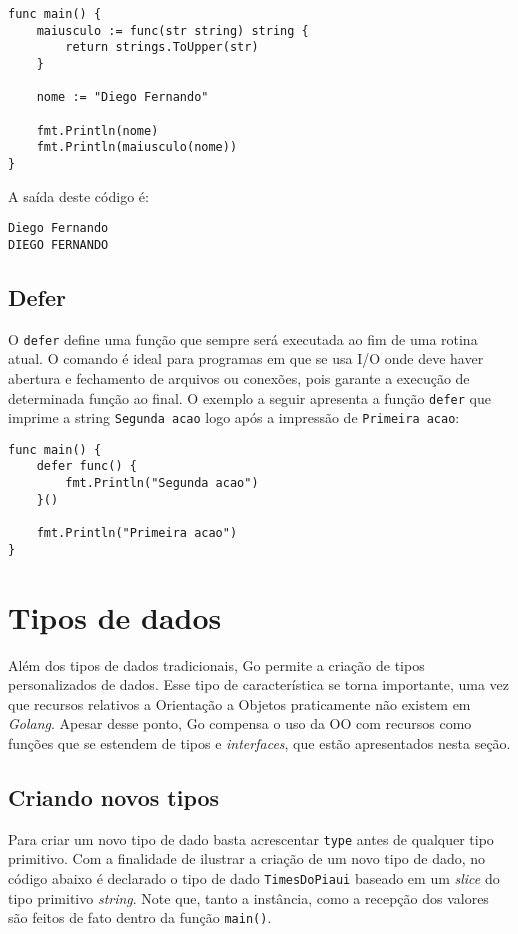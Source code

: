 \documentclass{SBCbookchapter}
\begin{document}
\begin{lstlisting}
func main() {
	maiusculo := func(str string) string {
		return strings.ToUpper(str)
	}
	
	nome := "Diego Fernando"
	
	fmt.Println(nome)
	fmt.Println(maiusculo(nome))
}
\end{lstlisting}

A saída deste código é:

\noindent\texttt{Diego Fernando}\\
\texttt{DIEGO FERNANDO}\\

\subsection{Defer}
\label{defer}

O \texttt{defer} define uma função que sempre será executada ao fim de uma rotina atual. O comando é ideal para programas em que se usa I/O onde deve haver abertura e fechamento de arquivos ou conexões, pois garante a execução de determinada função ao final. O exemplo a seguir apresenta a função \texttt{defer} que imprime a string \texttt{Segunda acao} logo após a impressão de \texttt{Primeira acao}:

\begin{lstlisting}
func main() {
	defer func() {
		fmt.Println("Segunda acao")
	}()
	
	fmt.Println("Primeira acao")
}
\end{lstlisting}

\section{Tipos de dados}
	
Além dos tipos de dados tradicionais, Go permite a criação de tipos personalizados de dados. Esse tipo de característica se torna importante, uma vez que recursos relativos a Orientação a Objetos praticamente não existem em \textit{Golang}. Apesar desse ponto, Go compensa o uso da OO com recursos como funções que se estendem de tipos e \textit{interfaces}, que estão apresentados nesta seção.
	
\subsection{Criando novos tipos}
	
Para criar um novo tipo de dado basta acrescentar \texttt{type} antes de qualquer tipo primitivo. Com a finalidade de ilustrar a criação de um novo tipo de dado, no código abaixo é declarado o tipo de dado \texttt{TimesDoPiaui} baseado em um \textit{slice} do tipo primitivo \textit{string}. Note que, tanto a instância, como a recepção dos valores são feitos de fato dentro da função \texttt{main()}.
	
\end{document}
